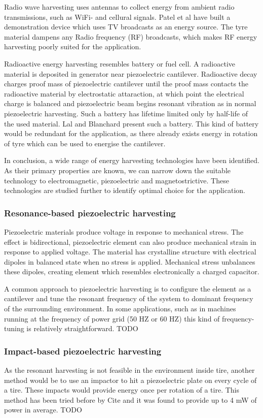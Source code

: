 Radio wave harvesting uses antennas to collect energy from ambient radio transmissions, such as WiFi- and cellural signals. Patel et al \cite{Patel2014} have built a demonstration device which uses TV broadcasts as an energy source. The tyre material dampens any Radio frequency (RF) broadcasts, which makes RF energy harvesting poorly suited for the application.

Radioactive energy harvesting resembles battery or fuel cell. A radioactive material is deposited in generator near piezoelectric cantilever. Radioactive decay charges proof mass of piezoelectric cantilever until the proof mass contacts the radioactive material by electrostatic attaraction, at which point the electrical charge is balanced and piezoelectric beam begins resonant vibration as in normal piezoelectric harvesting. Such a battery has lifetime limited only by half-life of the used material. Lal and Blanchard \cite{Lal2004} present such a battery. This kind of battery would be redundant for the application, as there already exists energy in rotation of tyre which can be used to energise the cantilever. 

In conclusion, a wide range of energy harvesting technologies have been identified. As their primary properties are known, we can narrow down the suitable technology to electromagnetic, piezoelectric and magnetostrictive. These technologies are studied further to identify optimal choice for the application.

\subsubsection{Resonance-based piezoelectric harvesting}
Piezoelectric materials produce voltage in response to mechanical stress. The effect is bidirectional, piezoelectric element can also produce mechanical strain in response to applied voltage. The material has crystalline structure with electrical dipoles in balanced state when no stress is applied. Mechanical stress unbalances these dipoles, creating element which resembles electronically a charged capacitor. 

A common approach to piezoelectric harvesting is to configure the element as a cantilever and tune the resonant frequency of the system to dominant frequency of the surrounding environment. In some applications, such as in machines running at the frequency of power grid (50 HZ or 60 HZ) this kind of frequency-tuning is relatively straightforward. TODO

\subsubsection{Impact-based piezoelectric harvesting}
As the resonant harvesting is not feasible in the environment inside tire, another method would be to use an impactor to hit a piezoelectric plate on every cycle of a tire. These impacts would provide energy once per rotation of a tire. This method has been tried before by {\color{red} Cite} and it was found to provide up to 4 mW of power in average. TODO

